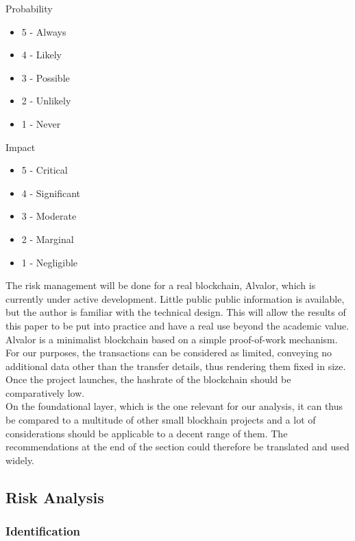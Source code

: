 \documentclass[12pt,a4paper]{article}
\begin{document}
Probability
\begin{itemize}
  \item 5 - Always
  \item 4 - Likely
  \item 3 - Possible
  \item 2 - Unlikely
  \item 1 - Never
\end{itemize}

Impact
\begin{itemize}
  \item 5 - Critical
  \item 4 - Significant
  \item 3 - Moderate
  \item 2 - Marginal
  \item 1 - Negligible
\end{itemize}

The risk management will be done for a real \gls{blockchain}, Alvalor, which is currently under active development. Little public public information is available, but the author is familiar with the technical design. This will allow the results of this paper to be put into practice and have a real use beyond the academic value.\\

Alvalor is a minimalist \gls{blockchain} based on a simple proof-of-work mechanism. For our purposes, the \glspl{transaction} can be considered as limited, conveying no additional data other than the transfer details, thus rendering them fixed in size. Once the project launches, the \gls{hashrate} of the \gls{blockchain} should be comparatively low.\\

On the foundational layer, which is the one relevant for our analysis, it can thus be compared to a multitude of other small blockhain projects and a lot of considerations should be applicable to a decent range of them. The recommendations at the end of the section could therefore be translated and used widely.\\

\subsection{Risk Analysis}

\subsubsection{Identification}
\end{document}
